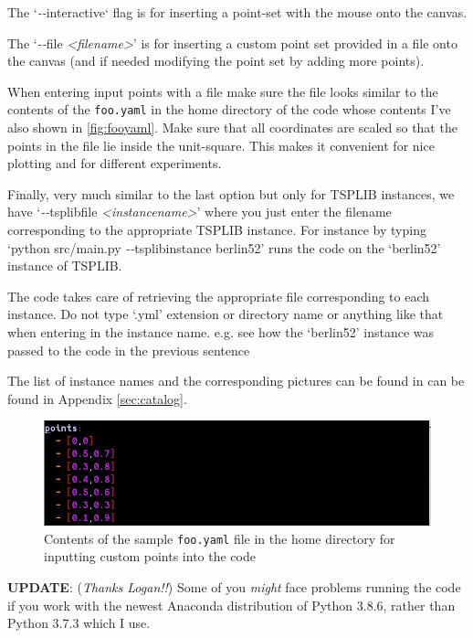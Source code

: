 \begin{appendices}
The `\textit{-}\textit{-}interactive` flag is for inserting a 
point-set with the mouse onto the canvas. 

The `\textit{-}\textit{-}file \textit{<filename>}' is for inserting a 
custom point set provided in a file onto the canvas  (and if needed 
modifying the point set by adding more points). 

When entering input points with a file make sure the file looks similar 
to the contents of the \verb|foo.yaml| in the home directory of the code 
whose contents I've also shown in \autoref{fig:fooyaml}. Make sure that 
all coordinates are scaled so that the points in the file lie inside the unit-square. This makes it convenient 
for nice plotting and for different experiments. 

Finally, very much similar to the last option but only for TSPLIB instances, we have
`\textit{-}\textit{-}tsplibfile \textit{<instancename>}' where you just enter the filename
corresponding to the appropriate TSPLIB instance. For instance by typing
`python src/main.py \textit{-}\textit{-}tsplibinstance berlin52' runs the code 
on the `berlin52' instance of TSPLIB. 

\begin{mdframed}
{\color{alizarin} 
The code takes care of retrieving the appropriate file corresponding to each instance. Do not 
type `.yml' extension or directory name or anything like that when entering in the instance name. e.g. see how the `berlin52'
instance was passed to the code in the previous sentence}
\end{mdframed}

The list of instance names and the corresponding pictures can be found in can be found in Appendix \autoref{sec:catalog}. 

\begin{figure}[H]
  \centering
  \includegraphics[width=12cm]{miscimages/fooyaml-screenshot.png}
  \caption{\label{fig:fooyaml} Contents of the sample \texttt{foo.yaml} file in the home directory for inputting custom points into the code}
\end{figure}




\begin{mdframed}[backgroundcolor=black!10,rightline=false,leftline=false]
\textbf{UPDATE}: (\textit{Thanks Logan!!}) Some of you \textit{might} face problems running the code if you work with the newest Anaconda distribution
of Python 3.8.6, rather than Python 3.7.3 which I use. 


\end{mdframed}
\end{appendices}
